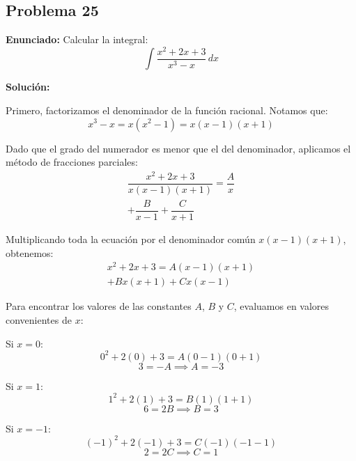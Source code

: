 \subsection*{Problema 25}

\textbf{Enunciado:} Calcular la integral:
\begin{equation*}
\int \dfrac{x^2 + 2x + 3}{x^3 - x} \, dx
\end{equation*}

\textbf{Solución:} 

Primero, factorizamos el denominador de la función racional. Notamos que:
\begin{equation*}
x^3 - x = x(x^2 - 1) = x(x - 1)(x + 1)
\end{equation*}

Dado que el grado del numerador es menor que el del denominador, aplicamos el método de fracciones parciales:
\begin{multline*}
\dfrac{x^2 + 2x + 3}{x(x - 1)(x + 1)} = \dfrac{A}{x} \\
+ \dfrac{B}{x - 1} + \dfrac{C}{x + 1}
\end{multline*}

Multiplicando toda la ecuación por el denominador común $x(x-1)(x+1)$, obtenemos:
\begin{multline*}
x^2 + 2x + 3 = A(x - 1)(x + 1) \\
+ Bx(x + 1) + Cx(x - 1)
\end{multline*}

Para encontrar los valores de las constantes $A$, $B$ y $C$, evaluamos en valores convenientes de $x$:

Si $x = 0$:
\begin{equation*}
0^2 + 2(0) + 3 = A(0 - 1)(0 + 1)
\end{equation*}
\begin{equation*}
3 = -A \implies A = -3
\end{equation*}

Si $x = 1$:
\begin{equation*}
1^2 + 2(1) + 3 = B(1)(1 + 1)
\end{equation*}
\begin{equation*}
6 = 2B \implies B = 3
\end{equation*}

Si $x = -1$:
\begin{equation*}
(-1)^2 + 2(-1) + 3 = C(-1)(-1 - 1)
\end{equation*}
\begin{equation*}
2 = 2C \implies C = 1
\end{equation*}

